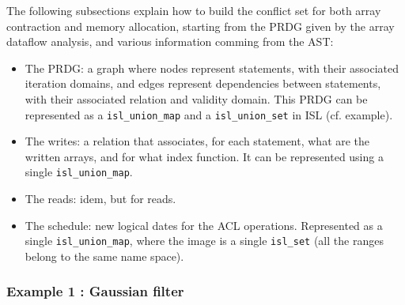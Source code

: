 \documentclass{article}
\begin{document}
The following subsections explain how to build the conflict set for both array
contraction and memory allocation, starting from the PRDG given by the array
dataflow analysis, and various information comming from the AST:
\begin{itemize}
  \item The PRDG: a graph where nodes represent statements, with their
  associated iteration domains, and edges represent dependencies between
  statements, with their associated relation and validity domain. This PRDG can
  be represented as a {\tt isl\_union\_map} and a {\tt isl\_union\_set} in ISL
  (cf. example).
  \item The writes: a relation that associates, for each statement, what are the
  written arrays, and for what index function. It can be represented using a
  single {\tt isl\_union\_map}.
  \item The reads: idem, but for reads.
  \item The schedule: new logical dates for the ACL operations. Represented as a
  single {\tt isl\_union\_map}, where the image is a single {\tt isl\_set}
  (all the ranges belong to the same name space).
\end{itemize}

\subsubsection*{Example 1 : Gaussian filter}
\end{document}
